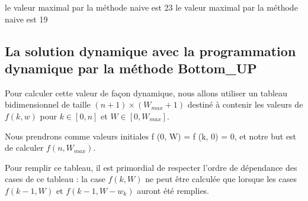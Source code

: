 \documentclass[letterpaper,10pt,english]{jupyterBook}
\begin{document}
\begin{sphinxVerbatimInput}

\begin{sphinxVerbatim}[commandchars=\\\{\}]
\end{sphinxVerbatim}
\end{sphinxVerbatimInput}
\begin{sphinxVerbatimOutput}

\begin{sphinxVerbatim}[commandchars=\\\{\}]
le valeur maximal par la méthode naive est  23
le valeur maximal par la méthode naive est  19
\end{sphinxVerbatim}
\end{sphinxVerbatimOutput}


\subsection{La solution dynamique avec la programmation dynamique par la méthode Bottom\_UP}
\label{\detokenize{notebooks/dynamicProgramming/ProgrammationDynamique:la-solution-dynamique-avec-la-programmation-dynamique-par-la-methode-bottom-up}}
\sphinxAtStartPar
Pour calculer cette valeur de façon dynamique, nous allons utiliser un tableau bi\sphinxhyphen{}dimensionnel de taille \((n + 1) × (W_{max} + 1)\) destiné à contenir les valeurs de \(f (k, w)\) pour \(k \in [0, n]\) et \(W \in [0, W_{max}]\).

\sphinxAtStartPar
Nous prendrons comme valeurs initiales f (0, W) = f (k, 0) = 0, et notre but est de calculer \(f(n, W_{max} )\).

\sphinxAtStartPar
Pour remplir ce tableau, il est primordial de respecter l’ordre de dépendance des cases de ce tableau : la case \(f (k, W)\) ne peut être calculée que lorsque les cases \(f (k-1, W)\) et \(f (k -1, W -w_k )\) auront été remplies.
\end{document}
